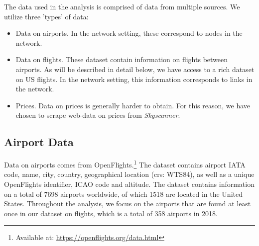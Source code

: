 \label{sec:data}
The data used in the analysis is comprised of data from multiple sources. We utilize three 'types' of data:
\begin{itemize}
    \item Data on airports. In the network setting, these correspond to nodes in the network. 
    \item Data on flights. These dataset contain information on flights between airports. As will be described in detail below, we have access to a rich dataset on US flights. In the network setting, this information corresponds to links in the network.
    \item Prices. Data on prices is generally harder to obtain. For this reason, we have chosen to scrape web-data on prices from \textit{Skyscanner}.
\end{itemize}

\subsection{Airport Data}
Data on airports comes from OpenFlights.\footnote{Available at: \url{https://openflights.org/data.html}} The dataset contains airport IATA code, name, city, country, geographical location (crs: WTS84), as well as a unique OpenFlights identifier, ICAO code and altitude. The dataset contains information on a total of 7698 airports worldwide, of which 1518 are located in the United States. Throughout the analysis, we focus on the airports that are found at least once in our dataset on flights, which is a total of 358 airports in 2018.

